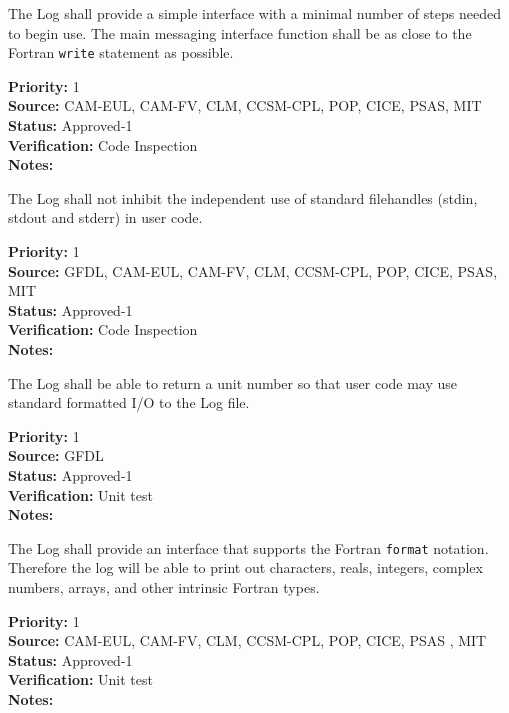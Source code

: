 
The Log shall provide a simple interface with a minimal number of
steps needed to begin use.  The main messaging interface function shall be as
close to the Fortran {\tt write} statement as possible.

\begin{reqlist}
{\bf Priority:} 1 \\
{\bf Source:} CAM-EUL, CAM-FV, CLM, CCSM-CPL, POP, CICE, PSAS, MIT  \\
{\bf Status:} Approved-1 \\
{\bf Verification:} Code Inspection \\
{\bf Notes:} 
\end{reqlist}


The Log shall not inhibit the independent use of standard filehandles
(stdin, stdout and stderr) in user code.

\begin{reqlist}
{\bf Priority:} 1 \\
{\bf Source:} GFDL, CAM-EUL, CAM-FV, CLM, CCSM-CPL, POP, CICE, PSAS, MIT  \\
{\bf Status:} Approved-1 \\
{\bf Verification:} Code Inspection \\
{\bf Notes:} 
\end{reqlist}


The Log shall be able to return a unit number so that user code may use 
standard formatted I/O to the Log file.

\begin{reqlist}
{\bf Priority:} 1 \\
{\bf Source:} GFDL \\
{\bf Status:} Approved-1 \\
{\bf Verification:} Unit test \\
{\bf Notes:} 
\end{reqlist}


The Log shall provide an interface that supports the Fortran {\tt format}
notation.  Therefore the log will be able to print out characters, reals, 
integers, complex numbers, arrays, and other intrinsic Fortran types.

\begin{reqlist}
{\bf Priority:} 1 \\
{\bf Source:} CAM-EUL, CAM-FV, CLM, CCSM-CPL, POP, CICE, PSAS , MIT \\
{\bf Status:} Approved-1 \\
{\bf Verification:} Unit test \\
{\bf Notes:} 
\end{reqlist}

